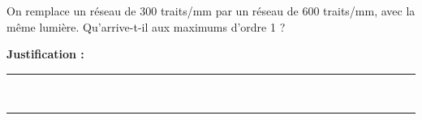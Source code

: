 On remplace un réseau de \num{300} traits/mm par un réseau de \num{600} traits/mm, avec la même lumière. Qu'arrive-t-il aux maximums d'ordre 1 ?

\choices

\noindent\textbf{Justification :} \hrulefill \\[2.5ex]
\rule{\linewidth}{0.4pt} \\[2.5ex]
\rule{\linewidth}{0.4pt}
\vfill
